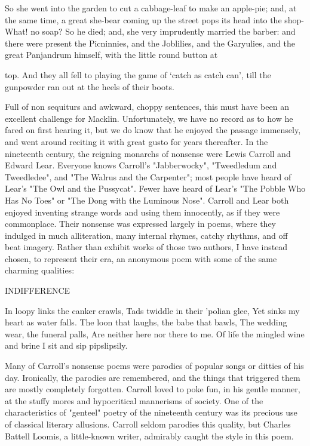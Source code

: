   So she went into the garden to cut a cabbage-leaf to make an apple-pie; and, at the
  same time, a great she-bear coming up the street pops its head into the shop-What!
  no soap? So he died; and, she very imprudently married the barber: and there were
  present the Picninnies, and the Joblilies, and the Garyulies, and the great
  Panjandrum himself, with the little round button at





   top. And they all fell to playing the game of `catch as catch can', till the gunpowder
   ran out at the heels of their boots.

Full of non sequiturs and awkward, choppy sentences, this must have been an excellent
challenge for Macklin. Unfortunately, we have no record as to how he fared on first
hearing it, but we do know that he enjoyed the passage immensely, and went around
reciting it with great gusto for years thereafter.
        In the nineteenth century, the reigning monarchs of nonsense were Lewis Carroll
and Edward Lear. Everyone knows Carroll's "Jabberwocky", "Tweedledum and
Tweedledee", and "The Walrus and the Carpenter"; most people have heard of Lear's
"The Owl and the Pussycat". Fewer have heard of Lear's "The Pobble Who Has No Toes"
or "The Dong with the Luminous Nose". Carroll and Lear both enjoyed inventing strange
words and using them innocently, as if they were commonplace. Their nonsense was
expressed largely in poems, where they indulged in much alliteration, many internal
rhymes, catchy rhythms, and off beat imagery. Rather than exhibit works of those two
authors, I have instead chosen, to represent their era, an anonymous poem with some of
the same charming qualities:

                                     INDIFFERENCE

                               In loopy links the canker crawls,
                               Tads twiddle in their 'polian glee,
                               Yet sinks my heart as water falls.
                               The loon that laughs, the babe that bawls,
                               The wedding wear, the funeral palls,
                               Are neither here nor there to me.
                               Of life the mingled wine and brine
                               I sit and sip pipslipsily.

       Many of Carroll's nonsense poems were parodies of popular songs or ditties of his
day. Ironically, the parodies are remembered, and the things that triggered them are
mostly completely forgotten. Carroll loved to poke fun, in his gentle manner, at the stuffy
mores and hypocritical mannerisms of society. One of the characteristics of "genteel"
poetry of the nineteenth century was its precious use of classical literary allusions. Carroll
seldom parodies this quality, but Charles Battell Loomis, a little-known writer, admirably
caught the style in this poem.

